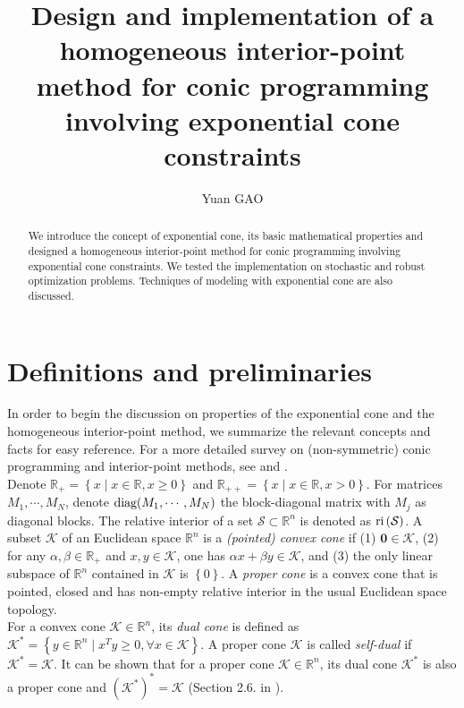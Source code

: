 \documentclass[10pt]{article}
\title{Design and implementation of a homogeneous interior-point method for conic programming involving exponential cone constraints}
\author{Yuan GAO}
\theoremstyle{definition}
\theoremstyle{plain}
\def\interior{\protect{\textnormal{ri}}}
\def\diagonal{\protect{\textnormal{diag}}}
\begin{document}
\maketitle

\begin{abstract}
We introduce the concept of exponential cone, its basic mathematical properties and designed a homogeneous interior-point method for conic programming involving exponential cone constraints. We tested the implementation on stochastic and robust optimization problems. Techniques of modeling with exponential cone are also discussed.
\end{abstract}

\section{Definitions and preliminaries}
In order to begin the discussion on properties of the exponential cone and the homogeneous interior-point method, we summarize the relevant concepts and facts for easy reference. For a more detailed survey on (non-symmetric) conic programming and interior-point methods, see \cite{Robert_thesis} and \cite{Akle_thesis}.\\

Denote $\mathbb{R}_+ = \left\{x \mid x\in \mathbb{R}, x\geq 0\right\}$ and $\mathbb{R}_{++} = \left\{x \mid x\in \mathbb{R}, x> 0\right\}$. For matrices $M_1, \cdots, M_N$, denote $\diagonal(M_1, \cdots, M_N)$ the block-diagonal matrix with $M_j$ as diagonal blocks. The relative interior of a set $\mathcal{S} \subset \mathbb{R}^n$ is denoted as $\interior\left(\mathcal{S}\right)$. A subset $\mathcal{K}$ of an Euclidean space $\mathbb{R}^n$ is a \textit{(pointed) convex cone} if (1) $\mathbf{0} \in \mathcal{K}$, (2) for any $\alpha, \beta \in \mathbb{R}_+$ and $x,y \in \mathcal{K}$, one has $\alpha x + \beta y \in \mathcal{K}$, and (3) the only linear subspace of $\mathbb{R}^n$ contained in $\mathcal{K}$ is $\left\{0\right\}$. A \textit{proper cone} is a convex cone that is pointed, closed and has non-empty relative interior in the usual Euclidean space topology.\\

For a convex cone $\mathcal{K} \in \mathbb{R}^n$, its \textit{dual cone} is defined as 
$\mathcal{K}^* = \left\{y\in \mathbb{R}^n \mid x^T y\geq 0, \forall x \in \mathcal{K} \right\}$. A proper cone $\mathcal{K}$ is called \textit{self-dual} if $\mathcal{K}^* = \mathcal{K}$. It can be shown that for a proper cone $\mathcal{K} \in \mathbb{R}^n$, its dual cone $\mathcal{K}^*$ is also a proper cone and $(\mathcal{K}^*)^* = \mathcal{K}$ (Section 2.6. in \cite{Boyd_Vander_Convex_Opt_Book}). \\
\end{document}
